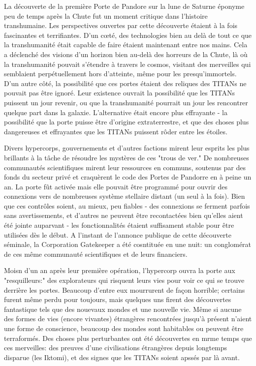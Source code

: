       La découverte de la première Porte de Pandore sur la lune de Saturne éponyme peu de temps après la Chute fut un moment critique dans l'histoire transhumaine. Les perspectives ouvertes par cette découverte étaient à la fois fascinantes et terrifiantes. D'un cœté, des technologies bien au delà de tout ce que la transhumanité était capable de faire étaient maintenant entre nos mains. Cela a déclenché des visions d'un horizon bien au-delà des horreurs de la Chute, là où la transhumanité pouvait s'étendre à travers le cosmos, visitant des merveilles qui semblaient perpétuellement hors d'atteinte, même  pour les presqu'immortels. D'un autre côté, la possibilité que ces portes étaient des reliques des TITANs ne pouvait pas être ignoré. Leur existence ouvrait la possibilité que les TITANs puissent un jour revenir, ou que la transhumanité pourrait un jour les rencontrer quelque part dans la galaxie. L'alternative était encore plus effrayante - la possibilité que la porte puisse être d'origine extraterrestre, et que des choses plus dangereuses et effrayantes que les TITANs puissent rôder entre les étoiles. 

      Divers hypercorps, gouvernements et d'autres factions mirent leur esprits les plus brillants à la tâche de résoudre les mystères de ces "trous de ver." De nombreuses communautés scientifiques mirent leur ressources en communs, soutenus par des fonds du secteur privé et craquèrent le code des Portes de Pandorre en à peine un an. La porte fût activée mais elle pouvait être programmé pour ouvrir des connexions vers de nombreuses système stellaire distant (un seul à la fois). Bien que ces contrôles soient, au mieux, peu fiables - des connexions se ferment parfois sans avertissements, et d'autres ne peuvent être recontactées bien qu'elles aient été jointe auparvant - les fonctionnalités étaient suffisament stable pour être utilisées dès le début. A l'instant de l'annonce publique de cette découverte séminale, la Corporation Gatekeeper a été cosntituée en une nuit: un conglomérat de ces même communauté scientifiques et de leurs financiers. 

      Moisn d'un an après leur première opération, l'hypercorp ouvra la porte aux "resquilleurs:" des explorateurs qui risquent leurs vies pour voir ce qui se trouve derrière les portes. Beaucoup d'entre eux mourrurent de façon horrible; certains furent même perdu pour toujours, mais quelques uns firent des découvertes fantastique tels que des nouevaux mondes et une nouvelle vie. Même si aucune des formes de vies (encore vivantes) étrangères rencontrées jusqu'à présent  n'aient une forme de conscience, beaucoup des mondes sont habitables ou peuvent être terraformés. Des choses plus perturbantes ont été découvertes en mrme temps que ces merveilles: des preuves d'une civilisations étrangères depuis longtemps disparue (les Iktomi), et des signes que les TITANs soient apssés par là avant. 

